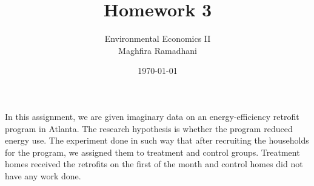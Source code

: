 \documentclass{article}
\begin{document}
 
\title{Homework 3}
\author{Environmental Economics II\\
Maghfira Ramadhani}
\date{\today}
\maketitle

In this assignment, we are given imaginary data on an energy-efficiency retrofit program in Atlanta. The research hypothesis is whether the program reduced energy use. The experiment done in such way that after recruiting the households for the program, we assigned them to treatment and control groups. Treatment homes received the retrofits on the first of the month and control homes did not have any work done.
\end{document}
